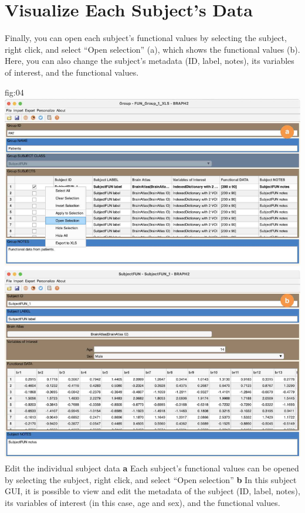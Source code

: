 \documentclass[justified]{tufte-handout}
\begin{document}

\section{Visualize Each Subject's Data}

Finally, you can open each subject's functional values by selecting the subject, right click, and select ``Open selection'' (a), which shows the functional values (b). Here, you can also change the subject's metadata (ID, label, notes), its variables of interest, and the functional values.

	{fig:04}
	{\includegraphics{fig04.jpg}
	}
	{Edit the individual subject data}
	{
	{\bf a} Each subject's functional values can be opened by selecting the subject, right click, and select ``Open selection''
	{\bf b} In this subject GUI, it is possible to view and edit the metadata of the subject (ID, label, notes), its variables of interest (in this case, age and sex), and the functional values. 
	}

\end{document}
